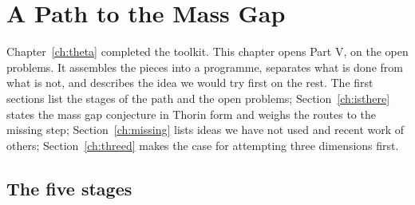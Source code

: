 \chapter{A Path to the Mass Gap}\label{ch:path}

Chapter~\ref{ch:theta} completed the toolkit. This chapter opens Part V, on the open problems. It assembles the pieces into a programme, separates what is done from what is not, and describes the idea we would try first on the rest. The first sections list the stages of the path and the open problems; Section~\ref{ch:isthere} states the mass gap conjecture in Thorin form and weighs the routes to the missing step; Section~\ref{ch:missing} lists ideas we have not used and recent work of others; Section~\ref{ch:threed} makes the case for attempting three dimensions first.

\section{The five stages}

